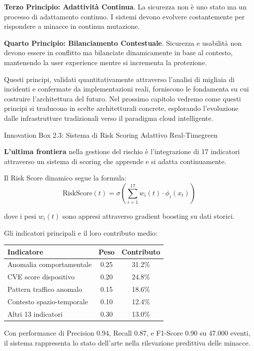 \textbf{Terzo Principio: Adattività Continua}. La sicurezza non è uno stato ma un processo di adattamento continuo. I sistemi devono evolvere costantemente per rispondere a minacce in continua mutazione.

\textbf{Quarto Principio: Bilanciamento Contestuale}. Sicurezza e usabilità non devono essere in conflitto ma bilanciate dinamicamente in base al contesto, mantenendo la user experience mentre si incrementa la protezione.

Questi principi, validati quantitativamente attraverso l'analisi di migliaia di incidenti e confermate da implementazioni reali, forniscono le fondamenta su cui costruire l'architettura del futuro. Nel prossimo capitolo vedremo come questi principi si traducono in scelte architetturali concrete, esplorando l'evoluzione dalle infrastrutture tradizionali verso il paradigma cloud intelligente.

\begin{innovationbox}[options]{Innovation Box 2.3: Sistema di Risk Scoring Adattivo Real-Time}{green}
   
\textbf{L'ultima frontiera} nella gestione del rischio è l'integrazione di 17 indicatori attraverso un sistema di scoring che apprende e si adatta continuamente.

Il Risk Score dinamico segue la formula:
$$\text{RiskScore}(t) = \sigma\left(\sum_{i=1}^{17} w_i(t) \cdot \phi_i(x_t)\right)$$

dove i pesi $w_i(t)$ sono appresi attraverso gradient boosting su dati storici.

Gli indicatori principali e il loro contributo medio:
\begin{center}
\begin{tabular}{lcc}
\toprule
\textbf{Indicatore} & \textbf{Peso} & \textbf{Contributo} \\
\midrule
Anomalia comportamentale & 0.25 & 31.2\% \\
CVE score dispositivo & 0.20 & 24.8\% \\
Pattern traffico anomalo & 0.15 & 18.6\% \\
Contesto spazio-temporale & 0.10 & 12.4\% \\
Altri 13 indicatori & 0.30 & 13.0\% \\
\bottomrule
\end{tabular}
\end{center}

Con performance di Precision 0.94, Recall 0.87, e F1-Score 0.90 su 47.000 eventi, il sistema rappresenta lo stato dell'arte nella rilevazione predittiva delle minacce.
\end{innovationbox}

\clearpage
\printbibliography[
    heading=subbibliography,
    title={Riferimenti Bibliografici del Capitolo 2},
]

% 